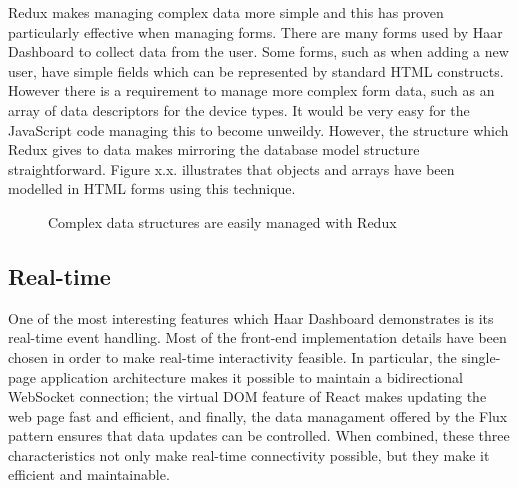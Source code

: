       Redux makes managing complex data more simple and this has proven particularly effective when managing forms. There are many forms used by Haar Dashboard to collect data from the user. Some forms, such as when adding a new user, have simple fields which can be represented by standard HTML constructs. However there is a requirement to manage more complex form data, such as an array of data descriptors for the device types. It would be very easy for the JavaScript code managing this to become unweildy. However, the structure which Redux gives to data makes mirroring the database model structure straightforward. Figure x.x. illustrates that objects and arrays have been modelled in HTML forms using this technique.

      \begin{figure}
        \centering
        \caption{Complex data structures are easily managed with Redux}
        \label{figure:form-array}
      \end{figure}

    \subsection{Real-time}
      One of the most interesting features which Haar Dashboard demonstrates is its real-time event handling. Most of the front-end implementation details have been chosen in order to make real-time interactivity feasible. In particular, the single-page application architecture makes it possible to maintain a bidirectional WebSocket connection; the virtual DOM feature of React makes updating the web page fast and efficient, and finally, the data managament offered by the Flux pattern ensures that data updates can be controlled. When combined, these three characteristics not only make real-time connectivity possible, but they make it efficient and maintainable.


